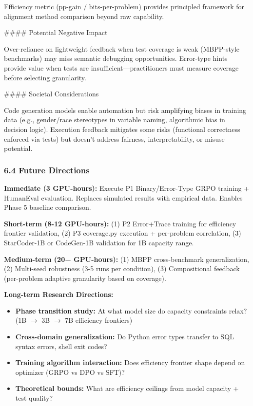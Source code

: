 Efficiency metric (pp-gain / bits-per-problem) provides principled framework for alignment method comparison beyond raw capability.

\#\#\#\# Potential Negative Impact

Over-reliance on lightweight feedback when test coverage is weak (MBPP-style benchmarks) may miss semantic debugging opportunities. Error-type hints provide value when tests are insufficient---practitioners must measure coverage before selecting granularity.

\#\#\#\# Societal Considerations

Code generation models enable automation but risk amplifying biases in training data (e.g., gender/race stereotypes in variable naming, algorithmic bias in decision logic). Execution feedback mitigates some risks (functional correctness enforced via tests) but doesn't address fairness, interpretability, or misuse potential.

\subsubsection{6.4 Future Directions}

\textbf{Immediate (3 GPU-hours):} Execute P1 Binary/Error-Type GRPO training + HumanEval evaluation. Replaces simulated results with empirical data. Enables Phase 5 baseline comparison.

\textbf{Short-term (8-12 GPU-hours):} (1) P2 Error+Trace training for efficiency frontier validation, (2) P3 coverage.py execution + per-problem correlation, (3) StarCoder-1B or CodeGen-1B validation for 1B capacity range.

\textbf{Medium-term (20+ GPU-hours):} (1) MBPP cross-benchmark generalization, (2) Multi-seed robustness (3-5 runs per condition), (3) Compositional feedback (per-problem adaptive granularity based on coverage).

\textbf{Long-term Research Directions:}
\begin{itemize}
\item \textbf{Phase transition study:} At what model size do capacity constraints relax? (1B $\rightarrow$ 3B $\rightarrow$ 7B efficiency frontiers)
\item \textbf{Cross-domain generalization:} Do Python error types transfer to SQL syntax errors, shell exit codes?
\item \textbf{Training algorithm interaction:} Does efficiency frontier shape depend on optimizer (GRPO vs DPO vs SFT)?
\item \textbf{Theoretical bounds:} What are efficiency ceilings from model capacity + test quality?
\end{itemize}
